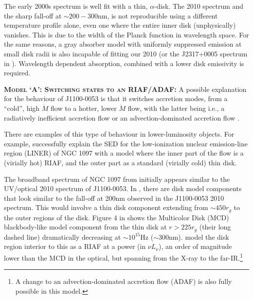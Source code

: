 \documentclass[11pt,a4paper]{article}
\begin{document}
The early 2000s spectrum is well fit with a thin, \citet{SS73}
$\alpha$-disk. The 2010 spectrum and the sharp fall-off at $\sim
200-300$nm, is not reproducible using a different temperature profile
alone, even one where the entire inner disk (unphysically)
vanishes. This is due to the width of the Planck function in
wavelength space. For the same reasons, a gray absorber model with
uniformly suppressed emission at small disk radii is also incapable of
fitting our 2010 (or the J2317+0005 spectrum in
\cite{Guo2016}). Wavelength dependent absorption, combined with a
lower disk emissivity is required.


\smallskip \smallskip
\noindent
\textbf{\textsc{Model `A': Switching states to an RIAF/ADAF: }} 
A possible explanation for the behaviour of J1100-0053 is that it
switches accretion modes, from a ``cold'', high $\dot{M}$ flow to a
hotter, lower $\dot{M}$ flow, with the latter being i.e., a
radiatively inefficient accretion flow \citep[RIAF; see reviews by
][]{Narayan1998, Quataert2001} or an advection-dominated accretion
flow \citep[ADAF; ][and references therein]{YuanNarayan2014}.

There are examples of this type of behaviour in lower-luminosity
objects.  For example, \citet{Nemmen2006} successfully explain the SED
for the low-ionization nuclear emission-line region (LINER) of NGC
1097 with a model where the inner part of the flow is a (virially hot)
RIAF, and the outer part as a standard (virially cold) thin disk.

The broadband spectrum of NGC 1097 from \citet{Nemmen2006} initially
appears similar to the UV/optical 2010 spectrum of J1100-0053.  In
\citet[][e.g., their Figure 4]{Nemmen2006}, there are disk model
components that look similar to the fall-off at 200nm observed in the
J1100-0053 2010 spectrum. This would involve a thin disk component
extending from $\sim 450r_{g}$ to the outer regions of the
disk. Figure 4 in \citet{Nemmen2006} shows the Multicolor Disk (MCD)
blackbody-like model component from the thin disk at $r>225r_{g}$
(their long dashed line) dramatically decreasing at $\sim 10^{15}$Hz
($\sim 300$nm). \citet{Nemmen2006} model the disk region interior to
this as a RIAF at a power (in $\nu L_{\nu}$), an order of magnitude
lower than the MCD in the optical, but spanning from the X-ray to the
far-IR.\footnote{A change to an advection-dominated accretion flow
(ADAF) is also fully possible in this model.}
\end{document}
